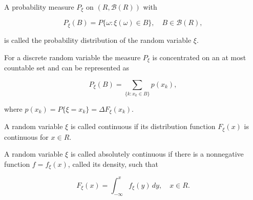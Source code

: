 A probability measure $P_\xi$ on $(R, \mathcal{B}(R))$ with

$$P_\xi(B) = P\{\omega : \xi(\omega) \in B\}, \quad B \in \mathcal{B}(R),$$

is called the probability distribution of the random variable $\xi$.

For a discrete random variable the measure $P_\xi$ is concentrated on an at most countable set and can be represented as

$$P_\xi(B) = \sum_{\{k : x_k \in B\}} p(x_k),$$

where $p(x_k) = P\{\xi = x_k\} = \Delta F_\xi(x_k)$.

A random variable $\xi$ is called continuous if its distribution function $F_\xi(x)$ is continuous for $x \in R$.

A random variable $\xi$ is called absolutely continuous if there is a nonnegative function $f = f_\xi(x)$, called its density, such that

$$F_\xi(x) = \int_{-\infty}^{x} f_\xi(y) \, dy, \quad x \in R.$$
